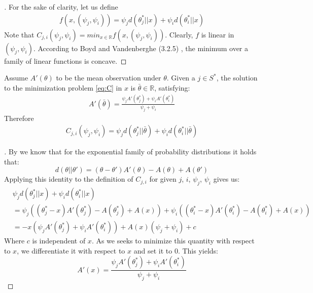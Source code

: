\begin{proof}[]
  For the sake of clarity, let us define
  \begin{align}
    f(x, (\psi_j, \psi_i)) = \psi_j d(\theta_j^*||x) + \psi_i d(\theta_i^* || x)
  \end{align}
  Note that $C_{j, i}(\psi_j, \psi_i) = min_{x \in \mathbb{R}} f(x,(\psi_j, \psi_i))$. Clearly, $f$ is linear in $(\psi_j, \psi_i)$. According to Boyd and Vandenberghe (3.2.5) \cite{Boyd:2004:CO:993483}, the minimum over a family of linear functions is concave.
\end{proof}

\textbf{}
Assume $A'(\theta)$ to be the mean observation under $\theta$. Given a $j \in S^*$, the solution to the minimization problem \eqref{eq:C} in $x$ is $\bar{\theta} \in \mathbb{R}$, satisfying:
\begin{align}
  A'(\bar{\theta}) = \frac{\psi_j A'(\theta_j^*) + \psi_i
      A'(\theta_i^*)}{\psi_j + \psi_i}
\end{align}
Therefore
\begin{align}
  C_{j, i}(\psi_j, \psi_i) = \psi_j d(\theta^*_j || \bar{\theta}) + \psi_i
      d(\theta^*_i || \bar{\theta})
\end{align}
\begin{proof}[]
  By  we know that for the exponential family of probability distributions it holds that:
  \[d(\theta||\theta') = (\theta - \theta')A'(\theta) - A(\theta) + A(\theta')\]
  Applying this identity to the definition of $C_{j, i}$  for given $j$, $i$, $\psi_j$, $\psi_i$ gives us:
  \begin{align}
    &\psi_{j}d(\theta^*_{j} || x) + \psi_{i}d(\theta_{i}^* ||x) \\
    &=\psi_j ((\theta_j^* - x)A'(\theta_j^*) - A(\theta_j^*) + A(x)) + \psi_i((\theta_i^* - x)A'(\theta_i^*) - A(\theta_i^*) + A(x))\\
    &= -x(\psi_j A'(\theta_j^*) + \psi_i A'(\theta_i^*)) + A(x)(\psi_j + \psi_i) + c
  \end{align}
  Where $c$ is independent of $x$. As we seeks to minimize this quantity with respect to $x$, we differentiate it with respect to $x$ and set it to 0. This yields:
  \[A'(x) = \frac{\psi_j A'(\theta_j^*) + \psi_i A'(\theta_i^*)}{\psi_j + \psi_i}\]
\end{proof}

